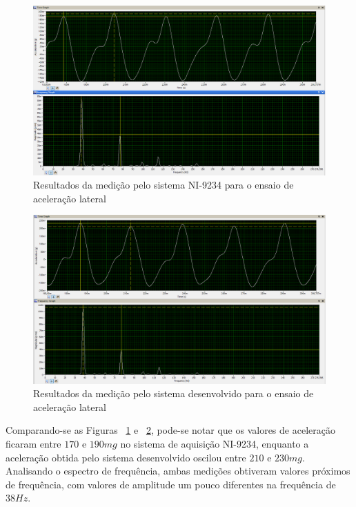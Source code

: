 \documentclass[
	12pt,				%
	openright,			%
	twoside,			%
	a4paper,			%
	english,			%
	french,				%
	spanish,			%
	brazil,				%
	]{abntex2}
\begin{document}
		\begin{figure}[!ht]
			\centering
			\includegraphics[width=\linewidth]{../Fotos/ni200mg.png}
			\caption{Resultados da medição pelo sistema NI-9234 para o ensaio de aceleração lateral}
			\label{fig:ni200mg}
		\end{figure}

		\begin{figure}[!ht]
			\centering
			\includegraphics[width=\linewidth]{../Fotos/kot200mg.png}
			\caption{Resultados da medição pelo sistema desenvolvido para o ensaio de aceleração lateral}
			\label{fig:kot200mg}
		\end{figure}

		Comparando-se as Figuras ~\ref{fig:ni200mg} e ~\ref{fig:kot200mg}, pode-se notar que os valores de aceleração ficaram entre $170$ e $190mg$ no sistema de aquisição NI-9234, enquanto a aceleração obtida pelo sistema desenvolvido oscilou entre $210$ e $230mg$. Analisando o espectro de frequência, ambas medições obtiveram valores próximos de frequência, com valores de amplitude um pouco diferentes na frequência de $38Hz$.
\end{document}
